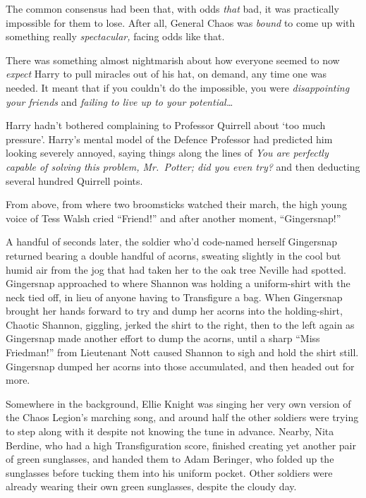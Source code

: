 The common consensus had been that, with odds \emph{that} bad, it was
practically impossible for them to lose. After all, General Chaos was
\emph{bound} to come up with something really \emph{spectacular,} facing
odds like that.

There was something almost nightmarish about how everyone seemed to now
\emph{expect} Harry to pull miracles out of his hat, on demand, any time
one was needed. It meant that if you couldn't do the impossible, you
were \emph{disappointing your friends} and \emph{failing to live up to
your potential\ldots{}}

Harry hadn't bothered complaining to Professor Quirrell about `too much
pressure'. Harry's mental model of the Defence Professor had predicted
him looking severely annoyed, saying things along the lines of \emph{You
are perfectly capable of solving this problem, Mr.~Potter; did you even
try?} and then deducting several hundred Quirrell points.

From above, from where two broomsticks watched their march, the high
young voice of Tess Walsh cried ``Friend!'' and after another moment,
``Gingersnap!''

A handful of seconds later, the soldier who'd code-named herself
Gingersnap returned bearing a double handful of acorns, sweating
slightly in the cool but humid air from the jog that had taken her to
the oak tree Neville had spotted. Gingersnap approached to where Shannon
was holding a uniform-shirt with the neck tied off, in lieu of anyone
having to Transfigure a bag. When Gingersnap brought her hands forward
to try and dump her acorns into the holding-shirt, Chaotic Shannon,
giggling, jerked the shirt to the right, then to the left again as
Gingersnap made another effort to dump the acorns, until a sharp ``Miss
Friedman!'' from Lieutenant Nott caused Shannon to sigh and hold the
shirt still. Gingersnap dumped her acorns into those accumulated, and
then headed out for more.

Somewhere in the background, Ellie Knight was singing her very own
version of the Chaos Legion's marching song, and around half the other
soldiers were trying to step along with it despite not knowing the tune
in advance. Nearby, Nita Berdine, who had a high Transfiguration score,
finished creating yet another pair of green sunglasses, and handed them
to Adam Beringer, who folded up the sunglasses before tucking them into
his uniform pocket. Other soldiers were already wearing their own green
sunglasses, despite the cloudy day.

